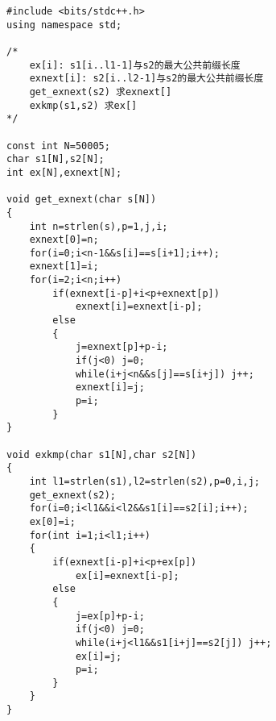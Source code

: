 \begin{lstlisting}
#include <bits/stdc++.h>
using namespace std;

/*
	ex[i]: s1[i..l1-1]与s2的最大公共前缀长度
	exnext[i]: s2[i..l2-1]与s2的最大公共前缀长度
	get_exnext(s2) 求exnext[]
	exkmp(s1,s2) 求ex[]
*/

const int N=50005;
char s1[N],s2[N];
int ex[N],exnext[N];

void get_exnext(char s[N])
{
    int n=strlen(s),p=1,j,i;
    exnext[0]=n;
    for(i=0;i<n-1&&s[i]==s[i+1];i++);
    exnext[1]=i;
    for(i=2;i<n;i++)
        if(exnext[i-p]+i<p+exnext[p]) 
            exnext[i]=exnext[i-p];
        else
        {
            j=exnext[p]+p-i;
            if(j<0) j=0;
            while(i+j<n&&s[j]==s[i+j]) j++;
            exnext[i]=j;
            p=i;
        }
}

void exkmp(char s1[N],char s2[N])
{
    int l1=strlen(s1),l2=strlen(s2),p=0,i,j;
    get_exnext(s2);
    for(i=0;i<l1&&i<l2&&s1[i]==s2[i];i++);
    ex[0]=i;
    for(int i=1;i<l1;i++)
    {
        if(exnext[i-p]+i<p+ex[p])
            ex[i]=exnext[i-p];
        else
        {
            j=ex[p]+p-i;
            if(j<0) j=0;
            while(i+j<l1&&s1[i+j]==s2[j]) j++;
            ex[i]=j;
            p=i;
        }
    }
}
\end{lstlisting}